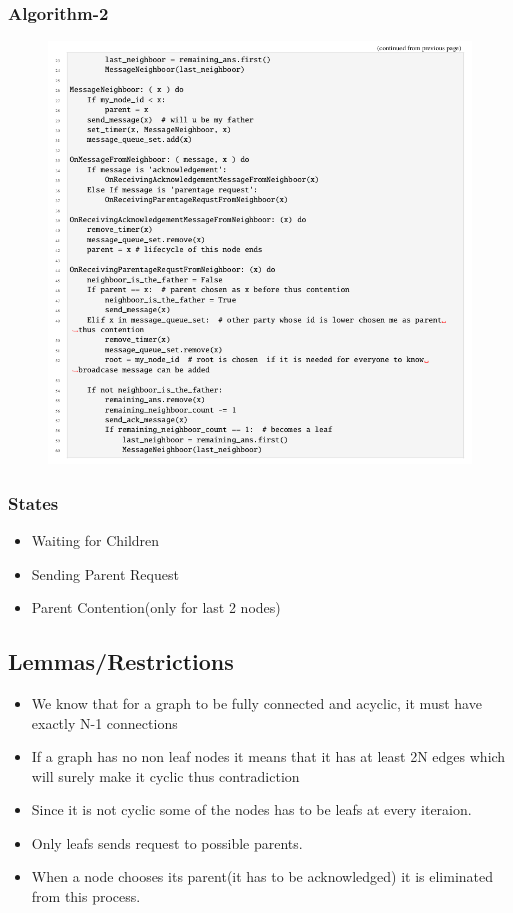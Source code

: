\documentclass[11pt]{beamer}              %
\begin{document}
\begin{frame}
    \frametitle{Algorithm-2}
    \begin{figure}
        \centering
        \includegraphics[scale=0.25]{figures/IEEE-2.png}
    \end{figure}
\end{frame}

\begin{frame}
\frametitle{States}


\begin{itemize}
	\item Waiting for Children
	\item Sending Parent Request
	\item Parent Contention(only for last 2 nodes)
\end{itemize}



\end{frame}

\subsection{Lemmas/Restrictions}
\begin{frame}
	\begin{itemize}
		\item We know that for a graph to be fully connected and acyclic, it must have exactly N-1 connections
		\item If a graph has no non leaf nodes it means that it has at least 2N edges which will surely make it cyclic thus contradiction
		\item Since it is not cyclic some of the nodes has to be leafs at every iteraion.
		\item Only leafs sends request to possible parents.
		\item When a node chooses its parent(it has to be acknowledged) it is eliminated from this process.
	\end{itemize}
\end{frame}
\end{document}
